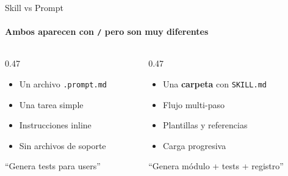 \documentclass[aspectratio=169,11pt]{beamer}
\begin{document}
\begin{frame}{Skill vs Prompt}
  \framesubtitle{Ambos aparecen con \texttt{/} pero son muy diferentes}

  \begin{columns}[T]
    \begin{column}{0.47\textwidth}
      \begin{tcolorbox}[colback=ixtiGreen!5, colframe=ixtiGreen!70!black, title={\textcolor{white}{\faComment\ Prompt}}, fonttitle=\bfseries]
        \small
        \begin{itemize}
          \item Un archivo \texttt{.prompt.md}
          \item Una tarea simple
          \item Instrucciones inline
          \item Sin archivos de soporte
        \end{itemize}
        \vspace{0.3em}
        \centering\textcolor{ixtiLightGray}{\footnotesize ``Genera tests para users''}
      \end{tcolorbox}
    \end{column}
    \begin{column}{0.47\textwidth}
      \begin{tcolorbox}[colback=ixtiTeal!5, colframe=ixtiTeal, title={\textcolor{white}{\faCogs\ Skill}}, fonttitle=\bfseries]
        \small
        \begin{itemize}
          \item Una \textbf{carpeta} con \texttt{SKILL.md}
          \item Flujo multi-paso
          \item Plantillas y referencias
          \item Carga progresiva
        \end{itemize}
        \vspace{0.3em}
        \centering\textcolor{ixtiLightGray}{\footnotesize ``Genera m\'odulo + tests + registro''}
      \end{tcolorbox}
    \end{column}
  \end{columns}

  \vspace{0.3em}
  \centering
\end{frame}
\end{document}
